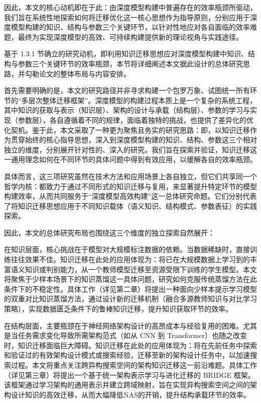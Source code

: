\documentclass[../main.tex]{subfiles}
\begin{document}
因此，本文的核心动机即在于此：由深度模型构建中普遍存在的效率瓶颈所驱动，我们旨在系统性地探索如何将迁移优化这一核心思想作为指导原则，分别应用于深度模型构建的知识、结构与参数三个关键环节，以针对性地应对各自面临的效率难题，最终为实现深度模型的高效、可持续构建提供新的理论视角与实践途径。


基于 1.3.1 节确立的研究动机，即利用知识迁移思想应对深度模型构建中知识、结构与参数三个关键环节的效率瓶颈，本节将详细阐述本文据此设计的总体研究思路，并勾勒论文的整体布局与内容安排。

首先需要明确的是，本文的研究路径并非寻求构建一个包罗万象、试图统一所有环节的“多层次整体迁移框架”。深度模型的构建过程本质上是一个复杂的系统工程，其中知识的获取与表示（知识层）、架构的设计与承载（结构层）、参数的学习与实现（参数层），各自遵循着不同的规律，面临着独特的挑战，也提供了差异化的优化契机。鉴于此，本文采取了一种更为聚焦且务实的研究思路：即，以知识迁移作为贯穿始终的核心指导思想，深入到深度模型构建的知识、结构、参数这三个相对独立的维度，分别展开针对性的、深入的研究。我们旨在探索并验证，知识迁移这一通用理念如何在不同环节的具体问题中得到有效应用，以缓解各自的效率瓶颈。

具体而言，这三项研究虽然在技术方法和应用场景上各自独立，但它们共享同一个哲学内核：都致力于通过不同形式的知识迁移与复用，来显著提升特定环节的模型构建效率，从而共同服务于“深度模型高效构建”这一总体研究命题。它们分别代表了将知识迁移思想应用于不同知识载体（语义知识、结构模式、参数表征）的实践探索。

因此，本文的总体研究布局也围绕这三个维度的独立探索自然展开：

在知识层面，核心挑战在于模型对大规模标注数据的依赖。当数据稀缺时，直接训练往往效果不佳。知识迁移在此处的应用体现为：将已在大规模数据上学习到的丰富语义知识或判别能力，从一个教师模型迁移至资源受限下训练的学生模型。本文将聚焦于少样本场景下的知识蒸馏这一具体问题，研究如何克服传统蒸馏方法在此条件下的不稳定性。具体工作（详见第二章）将提出一种面向少样本提示学习模型的双重对比知识蒸馏方法，通过设计新的迁移机制（融合多源教师知识与对比学习策略），实现数据匮乏条件下的鲁棒知识迁移，提升知识获取环节的效率。

在结构层面，主要瓶颈在于神经网络架构设计的高昂成本与经验复用的困难。尤其是当任务需求变化导致所需架构范式（如从 CNN 到 Transformer）也随之改变时，知识迁移面临巨大障碍。知识迁移在此处的应用体现为：将在先前任务中探索和验证过的有效架构设计模式或搜索经验，迁移至新的架构设计任务中，以加速搜索过程。本文将重点关注跨异构搜索空间的架构知识迁移这一前沿难题。具体工作（详见第三章）将提出一个基于统一架构表示学习与进化迁移的 BRIDGE 框架。该框架通过学习架构的通用表示并建立跨域映射，旨在实现异构搜索空间之间的架构设计知识的高效迁移，从而大幅降低NAS的开销，提升结构承载环节的效率。
\end{document}
